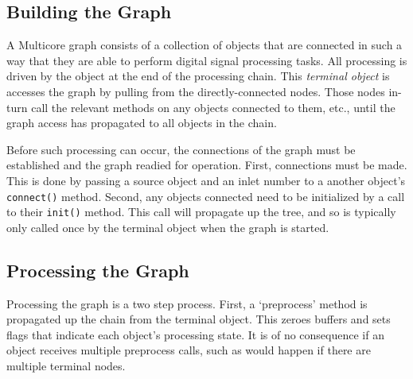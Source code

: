 \documentclass[twoside,a4paper]{article}
\begin{document}


\subsection{Building the Graph} %

A Multicore graph consists of a collection of objects that are connected in such a way that they are able to perform digital signal processing tasks.  All processing is driven by the object at the end of the processing chain.  This \emph{terminal object} is accesses the graph by pulling from the directly-connected nodes.  Those nodes in-turn call the relevant methods on any objects connected to them, etc., until the graph access has propagated to all objects in the chain.

Before such processing can occur, the connections of the graph must be established and the graph readied for operation.  First, connections must be made.  This is done by passing a source object and an inlet number to a another object's \texttt{connect()} method.  Second, any objects connected need to be initialized by a call to their \texttt{init()} method.  This call will propagate up the tree, and so is typically only called once by the terminal object when the graph is started.  

%
% 
% 



\subsection{Processing the Graph} %

Processing the graph is a two step process.  First, a `preprocess' method is propagated up the chain from the terminal object.  This zeroes buffers and sets flags that indicate each object's processing state.  It is of no consequence if an object receives multiple preprocess calls, such as would happen if there are multiple terminal nodes.
\end{document}
